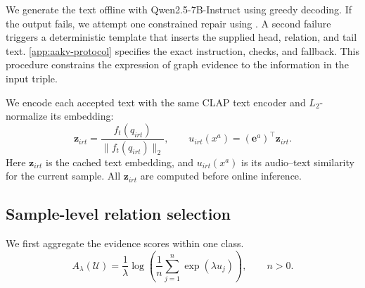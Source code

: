 We generate the text offline with Qwen2.5-7B-Instruct using greedy decoding.  If the output fails, we attempt one constrained repair using . A second failure triggers a deterministic template that inserts the supplied head, relation, and tail text. \ref{app:aakv-protocol} specifies the exact instruction, checks, and fallback. This procedure constrains the expression of graph evidence to the information in the input triple.

We encode each accepted text with the same CLAP text encoder and $L_2$-normalize its embedding:
\begin{equation}
\mathbf z_{irt}=\frac{f_t(q_{irt})}{\|f_t(q_{irt})\|_2},\qquad u_{irt}(x^a)=(\mathbf e^a)^\top\mathbf z_{irt}.
\label{eq:evidence-score}
\end{equation}
Here $\mathbf z_{irt}$ is the cached text embedding, and $u_{irt}(x^a)$ is its audio--text similarity for the current sample. All $\mathbf z_{irt}$ are computed before online inference.

\subsection{Sample-level relation selection}\label{sec:relation-selector-method}

 We first aggregate the evidence scores within one class. 
\begin{equation}
A_{\lambda}(\mathcal U)=\frac{1}{\lambda}\log\left(\frac{1}{n}\sum_{j=1}^{n}\exp(\lambda u_j)\right),\qquad n>0.
\label{eq:normlse}
\end{equation}

